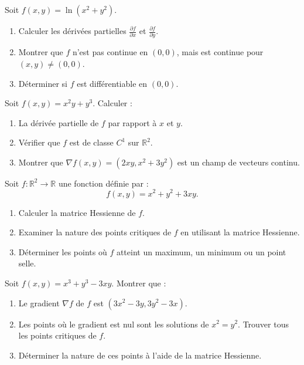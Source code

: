 \begin{exercice}
Soit \( f(x, y) = \ln(x^2 + y^2) \).
\begin{enumerate}
    \item Calculer les dérivées partielles \( \frac{\partial f}{\partial x} \) et \( \frac{\partial f}{\partial y} \).
    \item Montrer que \( f \) n'est pas continue en \( (0, 0) \), mais est continue pour \( (x, y) \neq (0, 0) \).
    \item Déterminer si \( f \) est différentiable en \( (0, 0) \).
\end{enumerate}
\end{exercice}

\begin{exercice}
Soit \( f(x, y) = x^2y + y^3 \). Calculer :
\begin{enumerate}
    \item La dérivée partielle de \( f \) par rapport à \( x \) et \( y \).
    \item Vérifier que \( f \) est de classe \( C^1 \) sur \( \mathbb{R}^2 \).
    \item Montrer que \( \nabla f(x, y) = (2xy, x^2 + 3y^2) \) est un champ de vecteurs continu.
\end{enumerate}
\end{exercice}

\begin{exercice}
Soit \( f : \mathbb{R}^2 \to \mathbb{R} \) une fonction définie par :
\[
f(x, y) = x^2 + y^2 + 3xy.
\]
\begin{enumerate}
    \item Calculer la matrice Hessienne de \( f \).
    \item Examiner la nature des points critiques de \( f \) en utilisant la matrice Hessienne.
    \item Déterminer les points où \( f \) atteint un maximum, un minimum ou un point selle.
\end{enumerate}
\end{exercice}

\begin{exercice}
Soit \( f(x, y) = x^3 + y^3 - 3xy \). Montrer que :
\begin{enumerate}
    \item Le gradient \( \nabla f \) de \( f \) est \( (3x^2 - 3y, 3y^2 - 3x) \).
    \item Les points où le gradient est nul sont les solutions de \( x^2 = y^2 \). Trouver tous les points critiques de \( f \).
    \item Déterminer la nature de ces points à l'aide de la matrice Hessienne.
\end{enumerate}
\end{exercice}


